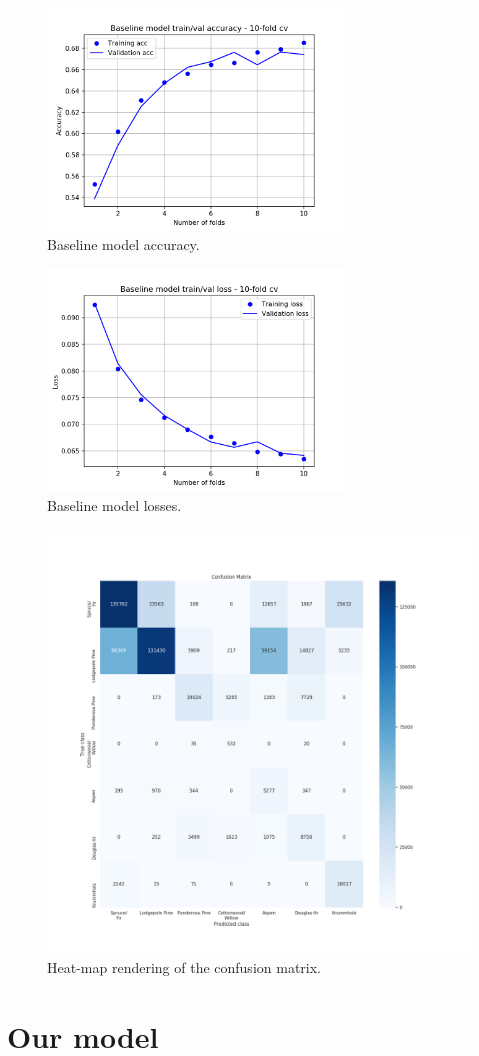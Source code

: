 \begin{figure}
	\centering
	\includegraphics[width=0.7\textwidth]{./TeX_files/img/baselinemodelacc.png}
	\caption{Baseline model accuracy.}
	\label{fig:baselinemodelacc}
\end{figure}
\begin{figure}
	\centering
	\includegraphics[width=0.7\textwidth]{./TeX_files/img/baselinemodelloss.png}
	\caption{Baseline model losses.}
	\label{fig:baselinemodelloss}
\end{figure}
\begin{figure}
	\centering
	\includegraphics[width=\textwidth]{./TeX_files/img/confmatheatmap.png}
	\caption{Heat-map rendering of the confusion matrix.}
	\label{fig:confmatheatmap}
\end{figure}
\section{Our model}